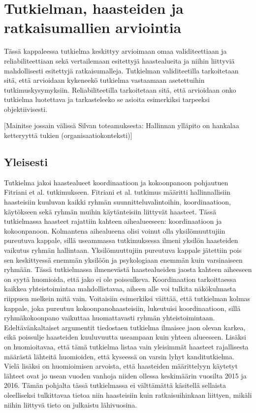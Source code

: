 \chapter{Tutkielman, haasteiden ja ratkaisumallien arviointia}

Tässä kappaleessa tutkielma keskittyy arvioimaan omaa validiteettiaan ja reliabiliteettiaan sekä vertailemaan esitettyjä haastealueita ja niihin liittyviä mahdollisesti esitettyjä ratkaisumalleja. Tutkielman validiteetilla tarkoitetaan sitä, että arvioidaan kykeneekö tutkielma vastaamaan asetettuihin tutkimuskysymyksiin. Reliabiliteetilla tarkoitetaan sitä, että arvioidaan onko tutkielma luotettava ja tarkasteleeko se asioita esimerkiksi tarpeeksi objektiivisesti.

[Mainitse jossain välissä Silvan toteamuksesta: Hallinnan ylläpito on hankalaa ketteryyttä tukien (organisaatiokonteksti)]

\section{Yleisesti}

Tutkielma jakoi haastealueet koordinaatioon ja kokoonpanoon pohjautuen Fitriani et al. \cite{7872736} tutkimukseen. Fitriani et al. tutkimus määritti hallinnallisiin haasteisiin kuuluvan kaikki ryhmän suunnitteluvalintoihin, koordinaatioon, käytökseen sekä ryhmän muihin käytänteisiin liittyvät haasteet. Tässä tutkielmassa haasteet rajattiin kahteen aihealueeseen: koordinaatioon ja kokoonpanoon. Kolmantena aihealueena olisi voinut olla yksilömuuttujiin pureutuva kappale, sillä useammassa tutkimuksessa ilmeni yksilön haasteiden vaikutus ryhmän hallintaan. Yksilömuuttujiin pureutuva kappale jätettiin pois sen keskittyessä enemmän yksilöön ja psykologiaan enemmän kuin varsinaiseen ryhmään. Tässä tutkielmassa ilmenevästä haastealueiden jaosta kahteen aiheeseen on syytä huomioida, että jako ei ole poissulkeva. Koordinaation tarkoittaessa kaikkea yhteistoimintaa mahdollistavaa, aiheen alle voi tulkita näkökulmasta riippuen melkein mitä vain. Voitaisiin esimerkiksi väittää, että tutkielman kolmas kappale, joka pureutuu kokoonpanohaasteisiin, lukeutuisi koordinaatioon, sillä ryhmäkokoonpano vaikuttaa huomattavasti ryhmän yhteistoimintaan. Edeltävänkaltaiset argumentit tiedostaen tutkielma ilmaisee jaon olevan karkea, eikä poissulje haasteiden kuuluvuutta useampaan kuin yhteen alueeseen. Lisäksi on huomioitavaa, että tämä tutkielma listaa vain yleisimmät haasteet rajallisesta määrästä lähteitä huomioiden, että kyseessä on varsin lyhyt kanditutkielma. Vielä lisäksi on huomioimisen arvoista, että haasteiden määrittelyyn käytetyt lähteet ovat jo usean vuoden vanhoja niiden ollessa keskimäärin vuosilta 2015 ja 2016. Tämän pohjalta tässä tutkielmassa ei välttämättä käsitellä sellaista oleelliseksi tulkittavaa tietoa niin haasteisiin kuin ratkaisuihinkaan liittyen, mikäli niihin liittyvä tieto on julkaistu lähivuosina.

